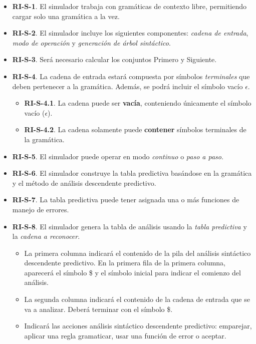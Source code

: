 \begin{itemize}
    \item \textbf{RI-S-1}. El simulador trabaja con gramáticas de contexto libre, permitiendo cargar solo una gramática a la vez.
    \item \textbf{RI-S-2}. El simulador incluye los siguientes componentes: \textit{cadena de entrada}, \textit{modo de operación} y \textit{generación de árbol sintáctico}.
    
    \item \textbf{RI-S-3}. Será necesario calcular los conjuntos Primero y Siguiente.
    
    \item \textbf{RI-S-4}. La cadena de entrada estará compuesta por símbolos \textit{terminales} que deben pertenecer a la gramática. Además, se podrá incluir el símbolo vacío $\epsilon$.
    \begin{itemize}
        \item \textbf{RI-S-4.1}. La cadena puede ser \textbf{vacía}, conteniendo únicamente el símbolo vacío ($\epsilon$).
        \item \textbf{RI-S-4.2}. La cadena solamente puede \textbf{contener} símbolos terminales de la gramática.
        \end{itemize}

    \item \textbf{RI-S-5}. El simulador puede operar en modo \textit{continuo} o \textit{paso a paso}.
    
    \item \textbf{RI-S-6}. El simulador construye la tabla predictiva basándose en la gramática y el método de análisis descendente predictivo.
    
    \item \textbf{RI-S-7}. La tabla predictiva puede tener asignada una o más funciones de manejo de errores.
    
    \item \textbf{RI-S-8}. El simulador genera la tabla de análisis usando la \textit{tabla predictiva} y la \textit{cadena a reconocer}.
    \begin{itemize}
        \item La primera columna indicará el contenido de la pila del análisis sintáctico descendente predictivo. En la primera fila de la primera columna, aparecerá el símbolo \$ y el símbolo inicial para indicar el comienzo del análisis.
       \item La segunda columna indicará el contenido de la cadena de entrada que se va a analizar. Deberá terminar con el símbolo \$.
       \item Indicará las acciones análisis sintáctico descendente predictivo: emparejar, aplicar una regla gramaticar, usar una función de error o aceptar.
    \end{itemize}
    

\end{itemize}
